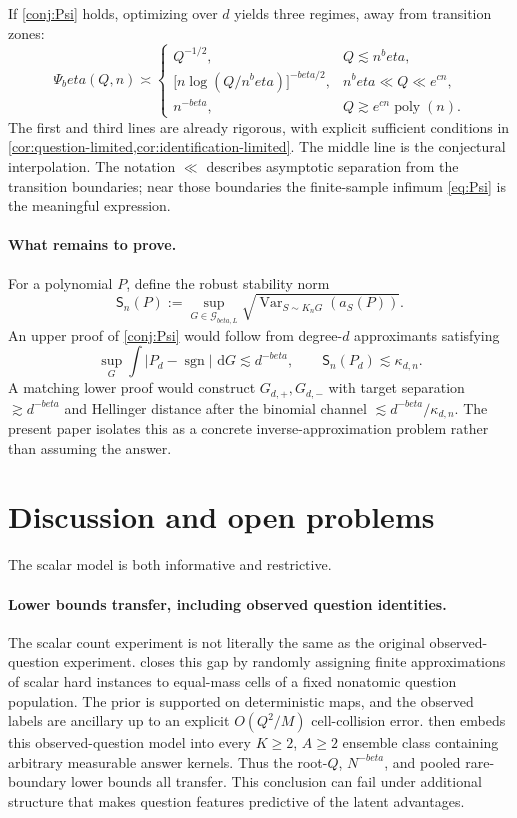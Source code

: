 \documentclass[11pt]{article}
\def\beta{beta}%
\newcommand{\sgn}{\operatorname{sgn}}
\newcommand{\Var}{\operatorname{Var}}
\newcommand{\calG}{\mathcal G}
\newcommand{\dd}{\,\mathrm d}
\begin{document}
If \cref{conj:Psi} holds, optimizing over $d$ yields three regimes, away from transition zones:
\begin{equation}
\label{eq:three-phase}
\Psi_\beta(Q,n)
\asymp
\begin{cases}
Q^{-1/2},
&Q\lesssim n^\beta,\\[1.2ex]
\bigl[n\log(Q/n^\beta)\bigr]^{-\beta/2},
&n^\beta\ll Q\ll e^{cn},\\[1.2ex]
n^{-\beta},
&Q\gtrsim e^{cn}\operatorname{poly}(n).
\end{cases}
\end{equation}
The first and third lines are already rigorous, with explicit sufficient conditions in \cref{cor:question-limited,cor:identification-limited}.  The middle line is the conjectural interpolation.  The notation $\ll$ describes asymptotic separation from the transition boundaries; near those boundaries the finite-sample infimum \eqref{eq:Psi} is the meaningful expression.

\paragraph{What remains to prove.}
For a polynomial $P$, define the robust stability norm
\[
\mathsf S_n(P)
:=
\sup_{G\in\calG_{\beta,L}}
\sqrt{\Var_{S\sim K_nG}(a_S(P))}.
\]
An upper proof of \cref{conj:Psi} would follow from degree-$d$ approximants satisfying
\[
\sup_G\int|P_d-\sgn|\,\dd G\lesssim d^{-\beta},
\qquad
\mathsf S_n(P_d)\lesssim\kappa_{d,n}.
\]
A matching lower proof would construct $G_{d,+},G_{d,-}$ with target separation $\gtrsim d^{-\beta}$ and Hellinger distance after the binomial channel $\lesssim d^{-\beta}/\kappa_{d,n}$.  The present paper isolates this as a concrete inverse-approximation problem rather than assuming the answer.

\section{Discussion and open problems}
\label{sec:back-general}

The scalar model is both informative and restrictive.

\paragraph{Lower bounds transfer, including observed question identities.}
The scalar count experiment is not literally the same as the original observed-question experiment.   closes this gap by randomly assigning finite approximations of scalar hard instances to equal-mass cells of a fixed nonatomic question population.  The prior is supported on deterministic maps, and the observed labels are ancillary up to an explicit $O(Q^2/M)$ cell-collision error.   then embeds this observed-question model into every $K\ge2$, $A\ge2$ ensemble class containing arbitrary measurable answer kernels.  Thus the root-$Q$, $N^{-\beta}$, and pooled rare-boundary lower bounds all transfer.  This conclusion can fail under additional structure that makes question features predictive of the latent advantages.
\end{document}
